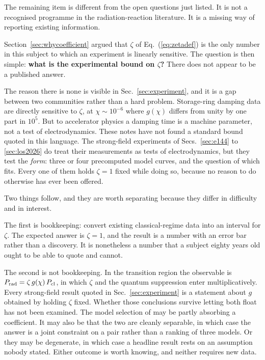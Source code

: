 \documentclass[preprint]{aastex701}
\begin{document}
The remaining item is different from the open questions just listed. It is not
a recognised programme in the radiation-reaction literature. It is a missing
way of reporting existing information.

Section~\ref{sec:whycoefficient} argued that $\zeta$ of Eq.~(\ref{eq:zetadef})
is the only number in this subject to which an experiment is linearly
sensitive. The question is then simple: \textbf{what is the
experimental bound on $\zeta$?} There does not appear to be a published answer.

The reason there is none is visible in Sec.~\ref{sec:experiment}, and it is a
gap between two communities rather than a hard problem. Storage-ring damping
data are directly sensitive to $\zeta$, at $\chi\sim10^{-6}$ where $g(\chi)$
differs from unity by one part in $10^{5}$. But to accelerator physics a
damping time is a machine parameter, not a test of electrodynamics. These notes
have not found a standard bound quoted in this language. The strong-field
experiments of Secs.~\ref{sec:e144} to \ref{sec:los2026} do treat their
measurements as tests of electrodynamics, but they test the \emph{form}: three
or four precomputed model curves, and the question of which fits. Every one of
them holds
$\zeta=1$ fixed while doing so, because no reason to do otherwise has ever been
offered.

Two things follow, and they are worth separating because they differ in
difficulty and in interest.

The first is bookkeeping: convert existing classical-regime data into an
interval for $\zeta$. The expected answer is $\zeta=1$, and the result is a
number with an error bar rather than a discovery. It is nonetheless a number
that a subject eighty years old ought to be able to quote and cannot.

The second is not bookkeeping. In the transition region the observable is
$P_{\rm rad} = \zeta\,g(\chi)\,P_{\rm cl}$, in which $\zeta$ and the quantum
suppression enter multiplicatively. Every strong-field result quoted in
Sec.~\ref{sec:experiment} is a statement about $g$ obtained by holding $\zeta$
fixed. Whether those conclusions survive letting both float has not been
examined. The model selection of \citet{los2026} may be partly absorbing a
coefficient. It may also be that the two are cleanly separable, in which case
the answer is a joint constraint on a pair rather than a ranking of three
models. Or they may be degenerate, in which case a headline result rests on an
assumption nobody stated. Either outcome is worth knowing, and neither requires
new data.
\end{document}
